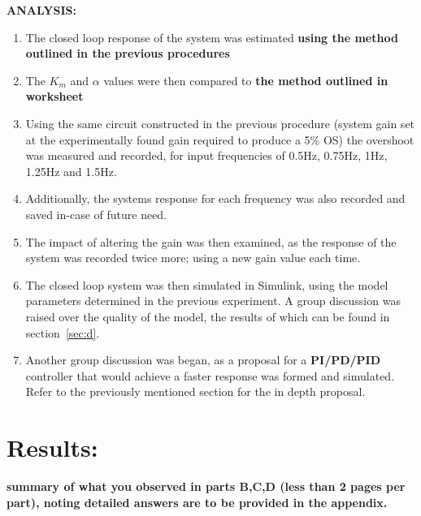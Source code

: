\documentclass[11pt,a4paper]{article}
\begin{document}
\textbf{ANALYSIS:}
\begin{enumerate}
	\item The closed loop response of the system was estimated \textbf{using the method outlined in the previous procedures}
	\item The $K_m$ and $\alpha$ values were then compared to \textbf{the method outlined in worksheet}
	\item Using the same circuit constructed in the previous procedure (system gain set at the experimentally found gain required to produce a 5\% OS) the overshoot was measured and recorded, for input frequencies of 0.5Hz, 0.75Hz, 1Hz, 1.25Hz and 1.5Hz. 
	\item Additionally, the systems response for each frequency was also recorded and saved in-case of future need.
	\item The impact of altering the gain was then examined, as the response of the system was recorded twice more; using a new gain value each time.
	\item The closed loop system was then simulated in Simulink, using the model parameters determined in the previous experiment. A group discussion was raised over the quality of the model, the results of which can be found in section~\ref{sec:d}.
	\item Another group discussion was began, as a proposal for a \textbf{PI/PD/PID} controller that would achieve a faster response was formed and simulated. Refer to the previously mentioned section for the in depth proposal.
\end{enumerate}








\pagebreak
\section{Results:}
\textbf{summary of what you observed in parts B,C,D (less than 2 pages per part), noting detailed answers are to be provided in the appendix.}
\end{document}
